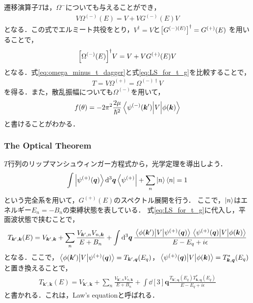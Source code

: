 \documentclass[a4paper,11pt]{ltjsarticle}
\begin{document}
遷移演算子$T$は，$\Omega^{-}$についても与えることができ，
\begin{align}\label{eq:omega_minus_t}
  V \Omega^{(-)}(E) = V + V G^{(-)}(E) V
\end{align}
となる．この式でエルミート共役をとり，$V^\dagger = V$と$\qty[G^{(-)(E)}] ^\dagger = G^{(+)}(E) $
を用いることで，
\begin{align}\label{eq:omega_minus_t_dagger}
  \qty[\Omega^{(-)}(E)]^\dagger V = V + V G^{(+)}(E) V
\end{align}
となる．式\ref{eq:omega_minus_t_dagger}と式\ref{eq:LS_for_t_g}を比較することで，
\begin{align}\label{eq:t_for_omega_pm}
  T = V \Omega^{(+)} = \Omega^{(-)\dagger} V
\end{align}
を得る．また，散乱振幅についても$\Omega^{(-)}$を用いて，
\begin{align}
  f(\theta) = - 2\pi^2 \frac{2\mu}{\hbar^2} \mel{\psi^{(-)}(\bm{k}')}{V}{\phi(\bm{k})}
\end{align}
と書けることがわかる．
\subsubsection{The Optical Theorem}
$T$行列のリップマンシュウィンガー方程式から，光学定理を導出しよう．
\begin{align}\label{eq:completeset}
  \int \ket{\psi^{(+)}(\bm{q})} \dd[3]{\bm{q}} \bra{\psi^{(+)}} + \sum_n \ket{n}\bra{n} = 1
\end{align}
という完全系を用いて，$G^{(+)}(E)$のスペクトル展開を行う．
ここで，$\ket{n}$はエネルギー$E_n = - B_n$の束縛状態を表している．
式\ref{eq:LS_for_t_g}に代入し，平面波状態で挟むことで，
\begin{align}\label{eq:spectral_exp_for_t}
  T_{\bm{k}', \bm{k}}(E) = V_{\bm{k}', \bm{k}} + \sum_n \frac{V_{\bm{k}', n} V_{n, \bm{k}}}{E + B_n} + \int \dd[3]{\bm{q}} \frac{\mel{\phi(\bm{k}')}{V}{\psi^{(+)}(\bm{q})}\mel{\psi^{(+)}(\bm{q})}{V}{\phi(\bm{k})}}{E-E_q + i\epsilon}
\end{align}
となる．ここで，$\mel{\phi(\bm{k}')}{V}{\psi^{(+)}(\bm{q})} = T_{\bm{k}', \bm{q}}(E_q)$，$\mel{\psi^{(+)}(\bm{q})}{V}{\phi(\bm{k})} = T_{\bm{k}, \bm{q}}^*(E_q)$と置き換えることで，
\begin{align}\label{eq:spectral_exp_for_t_2}
  T_{\bm{k}', \bm{k}}(E) = V_{\bm{k}', \bm{k}} + \sum_n \frac{V_{\bm{k}', n} V_{n, \bm{k}}}{E + B_n} + \int \dd[3]{\bm{q}} \frac{T_{\bm{k}', \bm{q}}(E_q)T_{\bm{k}, \bm{q}}^*(E_q)}{E-E_q + i\epsilon}
\end{align}
と書かれる．これは，Law's equationと呼ばれる．
\end{document}
